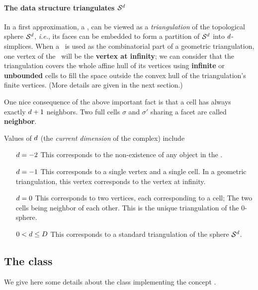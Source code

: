 {{\newcommand{\sphere}{\ensuremath{\mathcal S}}

\paragraph{The data structure triangulates $\sphere^\cd$}

In a first approximation,
a \tds, can be viewed as
a \emph{triangulation} of the topological sphere $\sphere^\cd$,
\emph{i.e.}, its faces can be embedded to form a partition of $\sphere^\cd$ into $d$-simplices. When a
\tds\ is used as the combinatorial part of a geometric triangulation, one
vertex of the \tds\ will be the \textbf{vertex at
infinity}; we can consider that the triangulation covers the whole
affine hull of its vertices
using \textbf{infinite} or \textbf{unbounded} cells to fill the space  outside the convex
hull of the triangulation's finite vertices. (More details are given in the next section.)


One nice consequence of the above important fact is that a cell has
always exactly  $d+1$ neighbors.
Two  full cells $\sigma$ and $\sigma'$ sharing a facet are called
\textbf{neighbor}.


Values of $d$ (the \emph{current dimension} of the complex) include
\begin{itemize}
\item[$d=-2$] This corresponds to the non-existence of any object in
  the \tds.
\item[$d=-1$] This corresponds to a single vertex and a single cell. In a
geometric triangulation, this vertex corresponds to the vertex at infinity.
\item[$d=0$] This corresponds to two vertices, each corresponding to
  a cell;
The two cells being neighbor of each other. This is the unique
triangulation of the $0$-sphere.
\item[$0<d\le D$] This corresponds to a standard triangulation of
the sphere $\sphere^\cd$.
\end{itemize}


\subsection{The class \label{triangulation:tds:impl}}

We give here some details about the class
implementing the concept .


}}
